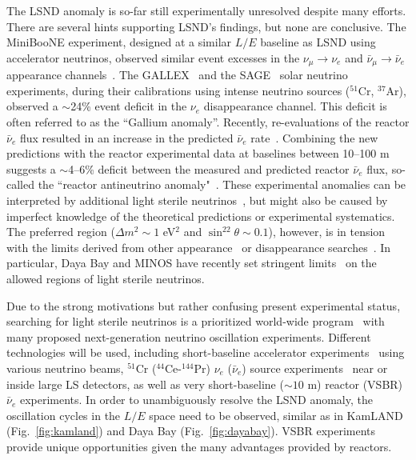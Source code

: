 \documentclass[aps,twocolumn,preprintnumbers,amsmath,superscriptaddress,amssymb,floats,nofootinbib]{revtex4-1}
\begin{document}
The LSND anomaly is so-far still experimentally unresolved despite many efforts. 
There are several hints supporting LSND's findings, but none are conclusive.
The MiniBooNE experiment, designed at a similar $L/E$ baseline as LSND using accelerator neutrinos, observed similar event excesses in the $\nu_{\mu}\rightarrow\nu_e$ and $\bar\nu_{\mu}\rightarrow\bar\nu_e$ appearance channels~\cite{MiniBooNE2007,MiniBooNE2013}. 
The GALLEX~\cite{GALLEX2010} and the SAGE~\cite{SAGE2009} solar neutrino experiments, during their calibrations using intense neutrino sources ($^{51}$Cr, $^{37}$Ar), observed a $\sim$24\% event deficit in the $\nu_e$ disappearance channel. 
This deficit is often referred to as the ``Gallium anomaly''. 
Recently, re-evaluations of the reactor $\bar\nu_e$ flux resulted in an increase in the predicted $\bar\nu_e$ rate~\cite{Mueller, Huber}. 
Combining the new predictions with the reactor experimental data at baselines between 10--100 m~\cite{ILL,Gosgen,Rovno,Krasnoyarsk,SRP,Bugey4,Bugey3} suggests a $\sim$4--6\% deficit between the measured and predicted reactor $\bar\nu_e$ flux, so-called the ``reactor antineutrino anomaly"~\cite{Mention,Zhang13}. 
These experimental anomalies can be interpreted by additional light sterile neutrinos~\cite{Guinti2011}, but might also be caused by imperfect knowledge of the theoretical predictions or experimental systematics.  
The preferred region ($\Delta{m}^2\sim1$ eV$^2$ and $\sin^22\theta\sim0.1$), however, is in tension with the limits derived from other appearance~\cite{KARMEN2002,NOMAD03,OPERA13,ICARUS13} or disappearance searches~\cite{Stockdale84,Dydak84,MiniBooNE12-nubar,MiniBooNE12-nu,SuperK2000,MINOS11-NC,Bugey3,Conrad12}. In particular, Daya Bay and MINOS have recently set stringent limits~\cite{DayaBaySterile,Sousa-Neutrino14} on the allowed regions of light sterile neutrinos.

Due to the strong motivations but rather confusing present experimental status, searching for light sterile neutrinos is a prioritized world-wide program~\cite{sterileWP} with many proposed next-generation neutrino oscillation experiments.
Different technologies will be used, including short-baseline accelerator experiments~\cite{IsoDAR,OscSNS,NESSiE,LAr1-ND,nuSTORM} using various neutrino beams, $^{51}$Cr ($^{44}$Ce-$^{144}$Pr) $\nu_e$ ($\bar\nu_e$) source experiments~\cite{Cribier2011,Dwyer2013,SOX,CeLAND} near or inside large LS detectors, as well as very short-baseline ($\sim10$ m) reactor (VSBR) $\bar\nu_e$ experiments. 
In order to unambiguously resolve the LSND anomaly, the oscillation cycles in the $L/E$ space need to be observed, similar as in KamLAND (Fig.~\ref{fig:kamland}) and Daya Bay (Fig.~\ref{fig:dayabay}). VSBR experiments provide unique opportunities given the many advantages provided by reactors.
\end{document}

